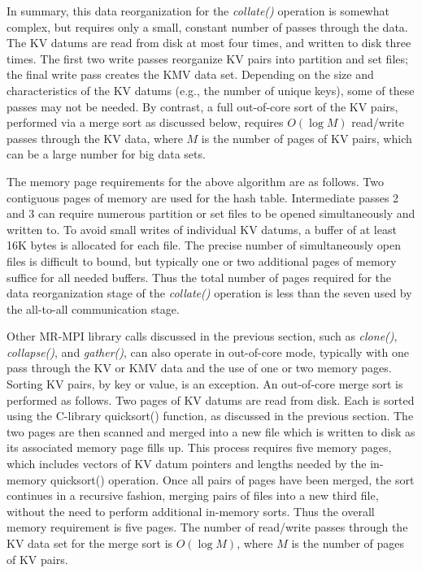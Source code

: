 In summary, this data reorganization for the {\it collate()} operation
is somewhat complex, but requires only a small, constant number of
passes through the data.  The KV datums are read from disk at most four
times, and written to disk three times.  The first two write passes
reorganize KV pairs into partition and set files; the final write pass
creates the KMV data set.  Depending on the size and characteristics
of the KV datums (e.g., the number of unique keys), some of
these passes may not be needed.  By contrast, a full out-of-core sort
of the KV pairs, performed via a merge sort as discussed below,
requires $O(\log{M})$ read/write passes through the KV data, where $M$
is the number of pages of KV pairs, which can be a large number for
big data sets.

The memory page requirements for the above algorithm are as follows.
Two contiguous pages of memory are used for the hash table.
Intermediate passes 2 and 3 can require numerous partition or set
files to be opened simultaneously and written to.  To avoid small
writes of individual KV datums, a buffer of at least 16K bytes is
allocated for each file.  The precise number of simultaneously open
files is difficult to bound, but typically one or two additional pages of 
memory suffice for all needed buffers.  Thus the total number of pages required
for the data reorganization stage of the {\it collate()} operation is
less than the seven used by the all-to-all communication stage.

Other MR-MPI library calls discussed in the previous section, such as
{\it clone()}, {\it collapse()}, and {\it gather()},
can also operate in out-of-core mode, typically with one pass
through the KV or KMV data and the use of one or two memory pages.
Sorting KV pairs, by key or value, is an exception.  An out-of-core
merge sort is performed as follows.  Two pages of KV datums are read
from disk.  Each is sorted using the C-library quicksort() function,
as discussed in the previous section.  The two pages are then scanned
and merged into a new file which is written to disk as its associated
memory page fills up.  This process requires five memory pages, which
includes vectors of KV datum pointers and lengths needed by the
in-memory quicksort() operation.  Once all pairs of pages have been
merged, the sort continues in a recursive fashion, merging pairs of
files into a new third file, without the need to perform additional
in-memory sorts.  Thus the overall memory requirement is five pages.  The
number of read/write passes through the KV data set for the merge sort
is $O(\log{M})$, where $M$ is the number of pages of KV pairs.
